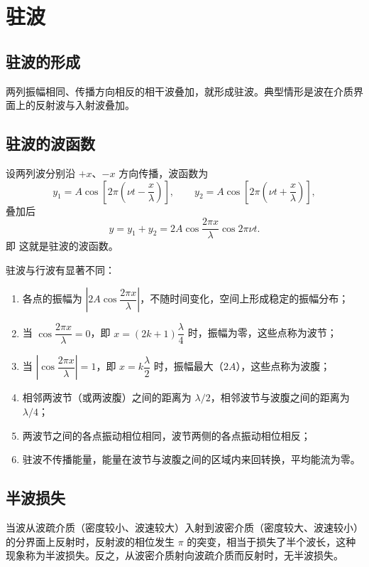 
\section{驻波}
    \subsection{驻波的形成}
    两列振幅相同、传播方向相反的相干波叠加，就形成驻波。典型情形是波在介质界面上的反射波与入射波叠加。

    \subsection{驻波的波函数}
    设两列波分别沿 $+x$、$-x$ 方向传播，波函数为
    \[
    y_1=A\cos\left[2\pi\left(\nu t-\frac{x}{\lambda}\right)\right],\qquad
    y_2=A\cos\left[2\pi\left(\nu t+\frac{x}{\lambda}\right)\right],
    \]
    叠加后
    \[
    y=y_1+y_2=2A\cos\frac{2\pi x}{\lambda}\cos2\pi\nu t.
    \]
    即
    这就是驻波的波函数。

    驻波与行波有显著不同：
    \begin{enumerate}
        \item 各点的振幅为 $\left|2A\cos\dfrac{2\pi x}{\lambda}\right|$，不随时间变化，空间上形成稳定的振幅分布；
        \item 当 $\cos\dfrac{2\pi x}{\lambda}=0$，即 $x=(2k+1)\dfrac{\lambda}{4}$ 时，振幅为零，这些点称为波节；
        \item 当 $\left|\cos\dfrac{2\pi x}{\lambda}\right|=1$，即 $x=k\dfrac{\lambda}{2}$ 时，振幅最大（$2A$），这些点称为波腹；
        \item 相邻两波节（或两波腹）之间的距离为 $\lambda/2$，相邻波节与波腹之间的距离为 $\lambda/4$；
        \item 两波节之间的各点振动相位相同，波节两侧的各点振动相位相反；
        \item 驻波不传播能量，能量在波节与波腹之间的区域内来回转换，平均能流为零。
    \end{enumerate}

    \subsection{半波损失}
    当波从波疏介质（密度较小、波速较大）入射到波密介质（密度较大、波速较小）的分界面上反射时，反射波的相位发生 $\pi$ 的突变，相当于损失了半个波长，这种现象称为半波损失。反之，从波密介质射向波疏介质而反射时，无半波损失。

